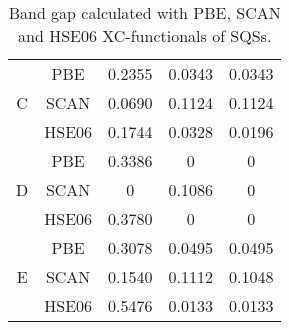 \begin{table}[H]
\begin{tabular}{@{}ccccc@{}}
\multicolumn{1}{c|}{\multirow{3}{*}{C}} & PBE           & 0.2355                                                           & 0.0343                                                           & 0.0343                                                            \\
\multicolumn{1}{c|}{}                   & SCAN          & 0.0690                                                           & 0.1124                                                           & 0.1124                                                            \\
\multicolumn{1}{c|}{}                   & HSE06         & 0.1744                                                           & 0.0328                                                           & 0.0196                                                            \\ \midrule
\multicolumn{1}{c|}{\multirow{3}{*}{D}} & PBE           & 0.3386                                                           & 0                                                                & 0                                                                 \\
\multicolumn{1}{c|}{}                   & SCAN          & 0                                                                & 0.1086                                                           & 0                                                                 \\
\multicolumn{1}{c|}{}                   & HSE06         & 0.3780                                                           & 0                                                                & 0                                                                 \\ \midrule
\multicolumn{1}{c|}{\multirow{3}{*}{E}} & PBE           & 0.3078                                                           & 0.0495                                                           & 0.0495                                                            \\
\multicolumn{1}{c|}{}                   & SCAN          & 0.1540                                                           & 0.1112                                                           & 0.1048                                                            \\
\multicolumn{1}{c|}{}                   & HSE06         & 0.5476                                                           & 0.0133                                                           & 0.0133                                                            \\ \bottomrule
\end{tabular}
\caption{Band gap calculated with PBE, SCAN and HSE06 XC-functionals of  SQSs.}
\end{table}


